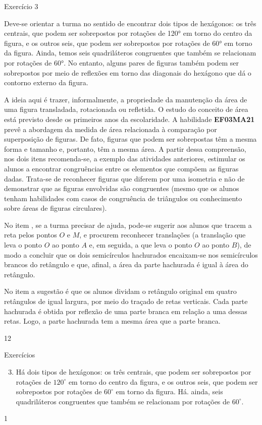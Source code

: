 \clearmargin
\marginpar{\vspace{-1em}}
\begin{sugestions}{Exercício 3}
{
Deve-se orientar a turma no sentido de encontrar dois tipos de hexágonos: os três centrais, que podem ser sobrepostos por rotações de 120° em torno do centro da figura, e os outros seis, que podem ser sobrepostos por rotações de 60° em torno da figura. Ainda, temos seis quadriláteros congruentes que também se relacionam por rotações de 60°.  No entanto, alguns pares de figuras também podem ser sobrepostos por meio de reflexões em torno das diagonais do hexágono que dá o contorno externo da figura.


A ideia aqui é trazer, informalmente, a propriedade da manutenção da área de uma figura transladada, rotacionada ou refletida. O estudo do conceito de área está previsto desde os primeiros anos da escolaridade. A habilidade \textbf{EF03MA21} prevê a abordagem da medida de área relacionada à comparação por superposição de figuras. De fato, figuras que podem ser sobrepostas têm a mesma forma e tamanho e, portanto, têm a mesma área.   A partir dessa compreensão, nos dois itens recomenda-se, a exemplo das atividades anteriores, estimular os alunos a encontrar congruências entre os elementos que compõem as figuras dadas. Trata-se de reconhecer figuras que diferem por uma isometria e não de demonstrar que as figuras envolvidas são congruentes (mesmo que os alunos tenham habilidades com casos de congruência de triângulos ou conhecimento sobre áreas de figuras circulares). 

No item , se a turma precisar de ajuda,  pode-se sugerir aos alunos que tracem a reta pelos pontos $O$ e $M$, e procurem reconhecer translações (a translação que leva o ponto $O$ ao ponto $A$ e, em seguida, a que leva o ponto $O$ ao ponto $B$), de modo a concluir que os dois semicírculos hachurados encaixam-se nos semicírculos brancos do retângulo e que, afinal,  a área da parte hachurada é igual à área do retângulo. 

No item  a sugestão é que os alunos dividam o retângulo original em quatro retângulos de igual largura, por meio do traçado de retas verticais. Cada parte hachurada é obtida por reflexão de uma parte branca em relação a uma dessas retas. Logo, a parte hachurada tem a mesma área que a parte branca.

}{1}{2}
\end{sugestions}
\begin{answer}{Exercícios}
{\exerciselist
\begin{enumerate}\setcounter{enumi}{2}
\item Há dois tipos de hexágonos: os três centrais, que podem ser sobrepostos por rotações de $120^{\circ}$ em torno do centro da figura, e os outros seis, que podem ser sobrepostos por rotações de $60^{\circ}$ em torno da figura. Há. ainda, seis quadriláteros congruentes que também se relacionam por rotações de $60^{\circ}$.  
\end{enumerate}
}{1}
\end{answer}
